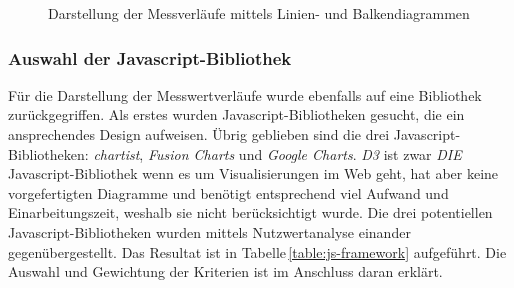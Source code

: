 
\begin{figure}[h!]
	\centering
	\caption{Darstellung der Messverläufe mittels Linien- und Balkendiagrammen}
	\label{img:charts}
\end{figure}


\subsubsection{Auswahl der Javascript-Bibliothek}
Für die Darstellung der Messwertverläufe wurde ebenfalls auf eine Bibliothek zurückgegriffen. Als erstes wurden Javascript-Bibliotheken gesucht, die ein ansprechendes Design aufweisen. Übrig geblieben sind die drei Javascript-Bibliotheken: \emph{chartist}, \emph{Fusion Charts} und \emph{Google Charts}. \emph{D3} ist zwar \emph{DIE} Javascript-Bibliothek wenn es um Visualisierungen im Web geht, hat aber keine vorgefertigten Diagramme und benötigt entsprechend viel Aufwand und Einarbeitungszeit, weshalb sie nicht berücksichtigt wurde. Die drei potentiellen Javascript-Bibliotheken wurden mittels Nutzwertanalyse einander gegenübergestellt. Das Resultat ist in Tabelle\,\ref{table:js-framework} aufgeführt. Die Auswahl und Gewichtung der Kriterien ist im Anschluss daran erklärt.

